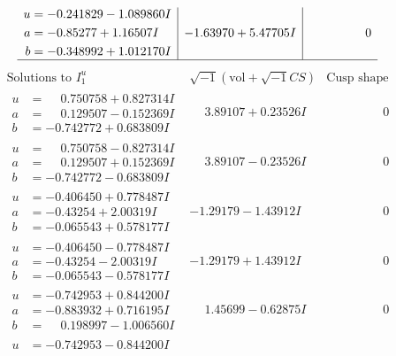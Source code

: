 \documentclass[1p]{elsarticle_modified}
\theoremstyle{definition}
\newcommand{\I}{\sqrt{-1}}
\begin{document}
$$\begin{array}{c|c|c}
\begin{aligned}
u &= -0.241829 - 1.089860 I \\
a &= -0.85277 + 1.16507 I \\
b &= -0.348992 + 1.012170 I\end{aligned}
 & -1.63970 + 5.47705 I & \phantom{-0.000000 } 0\\
 \hline 
 \end{array}$$\newpage$$\begin{array}{c|c|c}  
\text{Solutions to }I^u_{1}& \I (\text{vol} + \sqrt{-1}CS) & \text{Cusp shape}\\
 \hline 
\begin{aligned}
u &= \phantom{-}0.750758 + 0.827314 I \\
a &= \phantom{-}0.129507 - 0.152369 I \\
b &= -0.742772 + 0.683809 I\end{aligned}
 & \phantom{-}3.89107 + 0.23526 I & \phantom{-0.000000 } 0 \\ \hline\begin{aligned}
u &= \phantom{-}0.750758 - 0.827314 I \\
a &= \phantom{-}0.129507 + 0.152369 I \\
b &= -0.742772 - 0.683809 I\end{aligned}
 & \phantom{-}3.89107 - 0.23526 I & \phantom{-0.000000 } 0 \\ \hline\begin{aligned}
u &= -0.406450 + 0.778487 I \\
a &= -0.43254 + 2.00319 I \\
b &= -0.065543 + 0.578177 I\end{aligned}
 & -1.29179 - 1.43912 I & \phantom{-0.000000 } 0 \\ \hline\begin{aligned}
u &= -0.406450 - 0.778487 I \\
a &= -0.43254 - 2.00319 I \\
b &= -0.065543 - 0.578177 I\end{aligned}
 & -1.29179 + 1.43912 I & \phantom{-0.000000 } 0 \\ \hline\begin{aligned}
u &= -0.742953 + 0.844200 I \\
a &= -0.883932 + 0.716195 I \\
b &= \phantom{-}0.198997 - 1.006560 I\end{aligned}
 & \phantom{-}1.45699 - 0.62875 I & \phantom{-0.000000 } 0 \\ \hline\begin{aligned}
u &= -0.742953 - 0.844200 I \\

\end{aligned}
\end{array}$$
\end{document}
